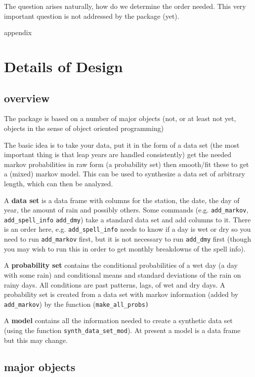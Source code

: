 \documentclass{article}
\begin{document}
The question arises naturally, how do we determine the order
needed.  This very important question is not addressed by the package
(yet).

appendix

\section{Details of Design}
\subsection{overview}




The package is based on a number of major objects
(not, or at least not yet, objects in the sense of
object oriented programming)

The basic idea is to take your data, put it in the form of a data set
(the most important thing is that leap years are handled consistently)
get the needed markov probabilities in raw form (a probability set)
then smooth/fit these to get a (mixed) markov model.  This can
be used to synthesize a data set of arbitrary length, which
can then be analyzed.

A {\bf data set} is a data frame with columns for the station, the date, the day
of year, the amount of rain and possibly others.      Some commands
(e.g. {\tt add\_markov}, {\tt add\_spell\_info} {\tt add\_dmy})
take a standard data set and add columns to it.  There is an order here,
e.g. {\tt add\_spell\_info} needs to know if a day is wet or dry so you need
to run {\tt add\_markov} first, but it is not necessary to run {\tt add\_dmy}
first (though you may wish to run this in order to get monthly breakdowns
of the spell info).

A {\bf probability set} contains the conditional probabilities of a wet
day (a day with some rain) and conditional means and standard deviations
of the rain on rainy days.  All conditions are past patterns, lags, of wet and
dry days.  A probability set is created from a data set with markov information
(added by  {\tt add\_markov}) by the function (\tt make\_all\_probs)

A {\bf model} contains all the information needed to create a synthetic
data set (using the function {\tt synth\_data\_set\_mod}).  At present
a model is a data frame but this may change.

\subsection{major objects}
\end{document}
